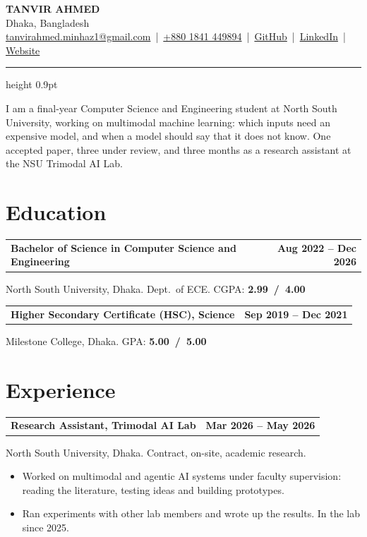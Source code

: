 \documentclass[10pt,letterpaper]{article}
\makeatletter
\newcommand{\entryhead}[2]{\par\needspace{4\baselineskip}\vspace{5pt}\noindent%
  \begin{tabular*}{\textwidth}[t]{@{}>{\raggedright\arraybackslash}p{0.75\textwidth}@{\extracolsep{\fill}}r@{}}
    \textbf{#1} & #2
  \end{tabular*}\par\vspace{1pt}}
\newcommand{\entry}[2]{\entryhead{#1}{\textbf{#2}}}
\newcommand{\gap}{\par\vspace{6pt}}
\let\origsection\section
\renewcommand{\section}[1]{\needspace{5\baselineskip}\origsection{#1}}
\makeatother
\begin{document}
\begin{center}
  {\Huge\bfseries TANVIR AHMED}\\[7pt]
  Dhaka, Bangladesh\\[3pt]
  \href{mailto:tanvirahmed.minhaz1@gmail.com}{tanvirahmed.minhaz1@gmail.com} \,|\,
  \href{tel:+8801841449894}{+880 1841 449894} \,|\,
  \href{https://github.com/minhaz-42}{GitHub} \,|\,
  \href{https://www.linkedin.com/in/tanvir-ahmed-ml/}{LinkedIn} \,|\,
  \href{https://minhaz-42.github.io/Tanvir-Ahmed/}{Website}
\end{center}
\vspace{-4pt}
{\hrule height 0.9pt}

\vspace{6pt}
\noindent
I am a final-year Computer Science and Engineering student at North South University, working on
multimodal machine learning: which inputs need an expensive model, and when a model should say that
it does not know. One accepted paper, three under review, and three months as a research assistant at
the NSU Trimodal AI Lab.

\section{Education}
\entry{Bachelor of Science in Computer Science and Engineering}{Aug 2022 -- Dec 2026}
North South University, Dhaka. Dept.\ of ECE. CGPA: \mbox{\textbf{2.99 / 4.00}}
\gap

\entry{Higher Secondary Certificate (HSC), Science}{Sep 2019 -- Dec 2021}
Milestone College, Dhaka. GPA: \mbox{\textbf{5.00 / 5.00}}


\section{Experience}
\entry{Research Assistant, Trimodal AI Lab}{Mar 2026 -- May 2026}
North South University, Dhaka. Contract, on-site, academic research.
\begin{itemize}
  \item Worked on multimodal and agentic AI systems under faculty supervision: reading the
    literature, testing ideas and building prototypes.
  \item Ran experiments with other lab members and wrote up the results. In the lab since 2025.
\end{itemize}
\end{document}
